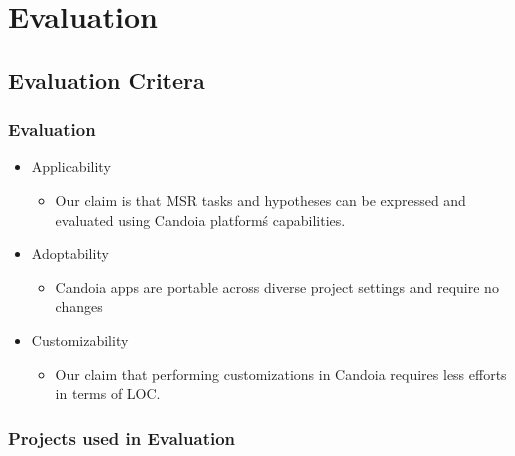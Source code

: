     \section{Evaluation}
    \subsection{Evaluation Critera}
        \begin{frame}
            \frametitle{Evaluation}
            \begin{itemize}
                \item Applicability
                    \begin{itemize}
                        \item Our claim is that MSR tasks and hypotheses can be expressed and evaluated using Candoia platform\'s capabilities.
                    \end{itemize}
                \item Adoptability
                    \begin{itemize}
                        \item Candoia apps are portable across diverse project settings and require no changes
                    \end{itemize}
                \item Customizability
                    \begin{itemize}
                        \item Our claim that performing customizations in Candoia requires less efforts in terms of LOC.
                    \end{itemize}
            \end{itemize}
         \end{frame}

        \begin{frame}
            \frametitle{Projects used in Evaluation}
            
         \end{frame}

